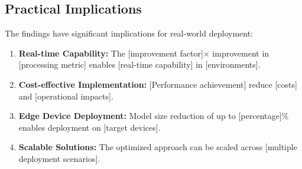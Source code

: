 \subsection{Practical Implications}

The findings have significant implications for real-world deployment:

\begin{enumerate}
\item \textbf{Real-time Capability:} The [improvement factor]× improvement in [processing metric] enables [real-time capability] in [environments].

\item \textbf{Cost-effective Implementation:} [Performance achievement] reduce [costs] and [operational impacts].

\item \textbf{Edge Device Deployment:} Model size reduction of up to [percentage]\% enables deployment on [target devices].

\item \textbf{Scalable Solutions:} The optimized approach can be scaled across [multiple deployment scenarios].
\end{enumerate}